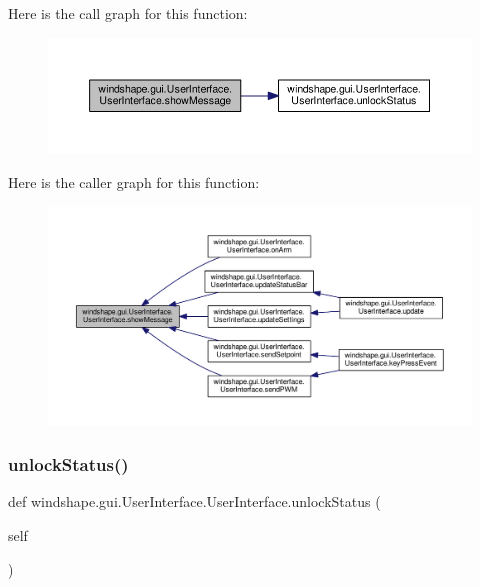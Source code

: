 Here is the call graph for this function\+:\nopagebreak
\begin{figure}[H]
\begin{center}
\leavevmode
\includegraphics[width=350pt]{classwindshape_1_1gui_1_1_user_interface_1_1_user_interface_abec836d949600735c76645000a412826_cgraph}
\end{center}
\end{figure}
Here is the caller graph for this function\+:\nopagebreak
\begin{figure}[H]
\begin{center}
\leavevmode
\includegraphics[width=350pt]{classwindshape_1_1gui_1_1_user_interface_1_1_user_interface_abec836d949600735c76645000a412826_icgraph}
\end{center}
\end{figure}
\mbox{\label{classwindshape_1_1gui_1_1_user_interface_1_1_user_interface_a50c3bc558203760d9cd4caebb5fdf319}} 
\subsubsection{\texorpdfstring{unlock\+Status()}{unlockStatus()}}
{\footnotesize\ttfamily def windshape.\+gui.\+User\+Interface.\+User\+Interface.\+unlock\+Status (\begin{DoxyParamCaption}\item[{}]{self }\end{DoxyParamCaption})}

